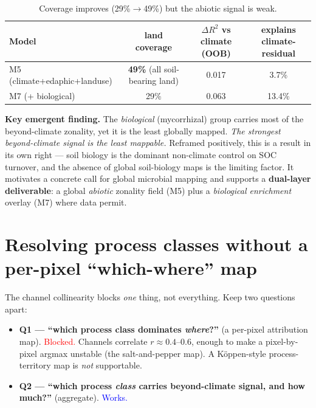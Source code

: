 \documentclass[11pt,a4paper]{article}
\begin{document}
\begin{table}[h]
\centering
\begin{tabular}{lccc}
\toprule
Model & land coverage & $\Delta R^2$ vs climate (OOB) & explains climate-residual\\
\midrule
M5 (climate+edaphic+landuse) & \textbf{49\%} (all soil-bearing land) & 0.017 & 3.7\%\\
M7 (+ biological)            & 29\% & 0.063 & 13.4\%\\
\bottomrule
\end{tabular}
\caption{Coverage improves (29\%$\to$49\%) but the abiotic signal is weak.}
\end{table}

\noindent\textbf{Key emergent finding.} The \emph{biological} (mycorrhizal) group
carries most of the beyond-climate zonality, yet it is the least globally mapped.
\emph{The strongest beyond-climate signal is the least mappable.} Reframed
positively, this is a result in its own right --- soil biology is the dominant
non-climate control on SOC turnover, and the absence of global soil-biology maps
is the limiting factor. It motivates a concrete call for global microbial mapping
and supports a \textbf{dual-layer deliverable}: a global \emph{abiotic} zonality
field (M5) plus a \emph{biological enrichment} overlay (M7) where data permit.

\section{Resolving process classes without a per-pixel ``which-where'' map}

The channel collinearity blocks \emph{one} thing, not everything. Keep two
questions apart:
\begin{itemize}[nosep]
  \item \textbf{Q1 --- ``which process class dominates \emph{where}?''}
  (a per-pixel attribution map). \textcolor{red}{Blocked.} Channels correlate
  $r\approx0.4$--$0.6$, enough to make a pixel-by-pixel argmax unstable (the
  salt-and-pepper map). A Köppen-style process-territory map is \emph{not}
  supportable.
  \item \textbf{Q2 --- ``which process \emph{class} carries beyond-climate
  signal, and how much?''} (aggregate). \textcolor{blue}{Works.}
\end{itemize}
\end{document}
